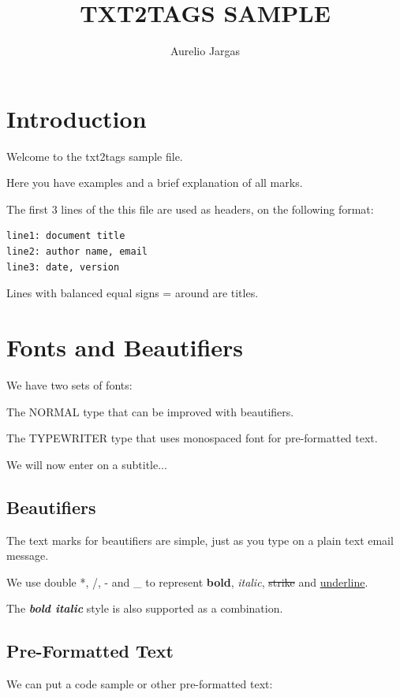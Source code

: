 \documentclass{article}
\title{TXT2TAGS SAMPLE}
\author{Aurelio Jargas}
\begin{document}
\maketitle
\clearpage


\section*{Introduction}

Welcome to the txt2tags sample file.

Here you have examples and a brief explanation of all
marks.

The first 3 lines of the this file are used as headers,
on the following format:

\begin{verbatim}
line1: document title
line2: author name, email
line3: date, version
\end{verbatim}

Lines with balanced equal signs = around are titles.

\section*{Fonts and Beautifiers}

We have two sets of fonts:

The NORMAL type that can be improved with beautifiers.

The TYPEWRITER type that uses monospaced font for
pre-formatted text.

We will now enter on a subtitle...

\subsection*{Beautifiers}

The text marks for beautifiers are simple, just as you
type on a plain text email message.

We use double *, /, - and \_ to represent \textbf{bold},
\textit{italic}, \sout{strike} and \underline{underline}.

The \textbf{\textit{bold italic}} style is also supported as a
combination.

\subsection*{Pre-Formatted Text}

We can put a code sample or other pre-formatted text:
\end{document}
